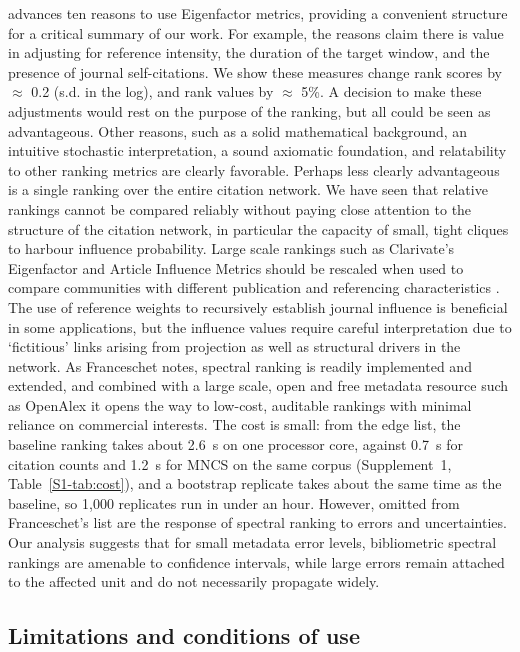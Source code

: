 \textcite{franceschetTenGoodReasons2010} advances ten reasons to use Eigenfactor metrics, providing a convenient structure for a critical summary of our work. For example, the reasons claim there is value in adjusting for reference intensity, the duration of the target window, and the presence of journal self-citations. We show these measures change rank scores by $\approx$ 0.2 (s.d. in the log), and rank values by $\approx$ 5\%. A decision to make these adjustments would rest on the purpose of the ranking, but all could be seen as advantageous. Other reasons, such as a solid mathematical background, an intuitive stochastic interpretation, a sound axiomatic foundation, and relatability to other ranking metrics are clearly favorable. Perhaps less clearly advantageous is a single ranking over the entire citation network. We have seen that relative rankings cannot be compared reliably without paying close attention to the structure of the citation network, in particular the capacity of small, tight cliques to harbour influence probability. Large scale rankings such as Clarivate's Eigenfactor and Article Influence Metrics should be rescaled when used to compare communities with different publication and referencing characteristics \citep{yuLogarithmicEigenfactorSolving2021}. The use of reference weights to recursively establish journal influence is beneficial in some applications, but the influence values require careful interpretation due to `fictitious' links arising from projection as well as structural drivers in the network. As Franceschet notes, spectral ranking  is readily implemented and extended, and combined with a large scale, open and free metadata resource such as OpenAlex it opens the way to low-cost, auditable rankings with minimal reliance on commercial interests. The cost is small: from the edge list, the baseline ranking takes about 2.6~s on one processor core, against 0.7~s for citation counts and 1.2~s for MNCS on the same corpus (Supplement~1, Table~\ref{S1-tab:cost}), and a bootstrap replicate takes about the same time as the baseline, so 1,000 replicates run in under an hour. However, omitted from Franceschet's list are the response of spectral ranking to errors and uncertainties. Our analysis suggests that for small metadata error levels, bibliometric spectral rankings are amenable to confidence intervals, while large errors remain attached to the affected unit and do not necessarily propagate widely.

\subsection{Limitations and conditions of use}
\label{sec:limitations}

